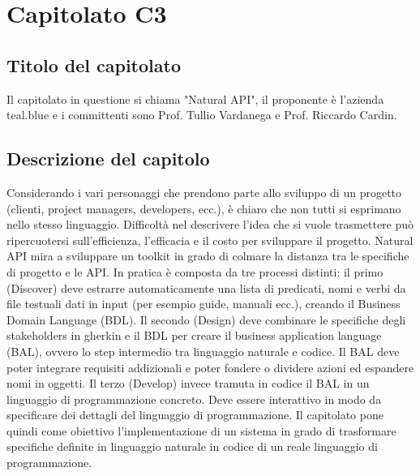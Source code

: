 \section{Capitolato C3}
\subsection{Titolo del capitolato}
Il capitolato in questione si chiama "Natural API", il proponente \`e l'azienda teal.blue e i committenti sono Prof. Tullio Vardanega e Prof. Riccardo Cardin.

\subsection{Descrizione del capitolo}
Considerando i vari personaggi che prendono parte allo sviluppo di un progetto (clienti, project managers, developers, ecc.), \`e chiaro che non tutti si esprimano nello stesso linguaggio. Difficolt\`a nel descrivere l'idea che si vuole trasmettere pu\`o ripercuotersi sull'efficienza, l'efficacia e il costo per sviluppare il progetto. Natural API mira a sviluppare un toolkit in grado di colmare la distanza tra le specifiche di progetto e le API. In pratica \`e composta da tre processi distinti: il primo (Discover) deve estrarre automaticamente una lista di predicati, nomi e verbi da file testuali dati in input (per esempio guide, manuali ecc.), creando il Business Domain Language (BDL).
Il secondo (Design) deve combinare le specifiche degli stakeholders in gherkin e il BDL per creare il business application language (BAL), ovvero lo step intermedio tra linguaggio naturale e codice. Il BAL deve poter integrare requisiti addizionali e poter fondere o dividere azioni ed espandere nomi in oggetti.
Il terzo (Develop) invece tramuta in codice il BAL in un linguaggio di programmazione concreto. Deve essere interattivo in modo da specificare dei dettagli del linguaggio di programmazione.
Il capitolato pone quindi come obiettivo l'implementazione di un sistema in grado di trasformare specifiche definite in linguaggio naturale in codice di un reale linguaggio di programmazione.

